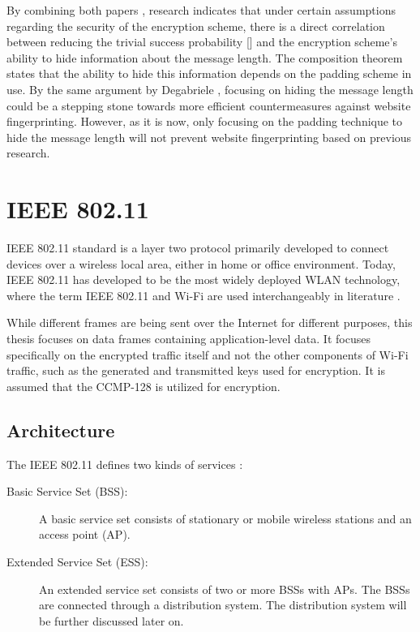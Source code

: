 By combining both papers \cite{DBLP:conf/ccs/Degabriele21, DBLP:conf/ctrsa/GellertJLN22}, research indicates that under certain assumptions regarding the security of the encryption scheme, there is a direct correlation between reducing the trivial success probability [] and the encryption scheme's ability to hide information about the message length. The composition theorem states that the ability to hide this information depends on the padding scheme in use. By the same argument by Degabriele \cite{DBLP:conf/ccs/Degabriele21}, focusing on hiding the message length could be a stepping stone towards more efficient countermeasures against website fingerprinting. However, as it is now, only focusing on the padding technique to hide the message length will not prevent website fingerprinting based on previous research.

\section{IEEE 802.11\label{sec:wireless-back}}

IEEE 802.11 standard is a layer two protocol primarily developed to connect devices over a wireless local area, either in home or office environment. Today, IEEE 802.11 has developed to be the most widely deployed WLAN technology, where the term IEEE 802.11 and Wi-Fi are used interchangeably in literature \cite{banerji2013ieee}.

While different frames are being sent over the Internet for different purposes, this thesis focuses on data frames containing application-level data. It focuses specifically on the encrypted traffic itself and not the other components of Wi-Fi traffic, such as the generated and transmitted keys used for encryption. It is assumed that the CCMP-128 is utilized for encryption.

\subsection{Architecture\label{subsec:arch-back}}

The IEEE 802.11 defines two kinds of services \cite{forouzan2007data}:

\begin{description}
\item[Basic Service Set (BSS):] A basic service set consists of stationary or mobile wireless stations and an access point (AP). 

\item[Extended Service Set (ESS):] An extended service set consists of two or more BSSs with APs. The BSSs are connected through a distribution system. The distribution system will be further discussed later on.

\end{description}

